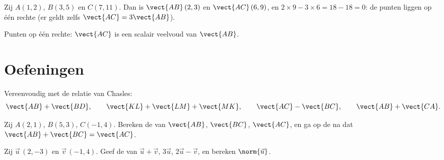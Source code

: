 \begin{example}\label{ex:g10:vectors:alignment}
Zij $A(1, 2)$, $B(3, 5)$ en $C(7, 11)$. Dan is $\vect{AB}\,(2, 3)$ en
$\vect{AC}\,(6, 9)$, en $2 \times 9 - 3 \times 6 = 18 - 18 = 0$: de punten
liggen op één rechte (er geldt zelfs $\vect{AC} = 3\vect{AB}$).
\end{example}

\begin{omfigure}

{\small Punten op één rechte: $\vect{AC}$ is een scalair veelvoud van
$\vect{AB}$.}
\end{omfigure}

\section{Oefeningen}

\begin{exercise}[$\star$]\label{exo:g10:vectors:1}
Vereenvoudig met de relatie van Chasles:
\[
\vect{AB} + \vect{BD}, \qquad
\vect{KL} + \vect{LM} + \vect{MK}, \qquad
\vect{AC} - \vect{BC}, \qquad
\vect{AB} + \vect{CA}.
\]
\end{exercise}

\begin{exercise}[$\star$]\label{exo:g10:vectors:2}
Zij $A(2, 1)$, $B(5, 3)$, $C(-1, 4)$. Bereken de  van
$\vect{AB}$, $\vect{BC}$, $\vect{AC}$, en ga op de  na dat
$\vect{AB} + \vect{BC} = \vect{AC}$.
\end{exercise}

\begin{exercise}[$\star$]\label{exo:g10:vectors:3}
Zij $\vec u\,(2, -3)$ en $\vec v\,(-1, 4)$. Geef de  van
$\vec u + \vec v$, $3\vec u$, $2\vec u - \vec v$, en bereken
$\norm{\vec u}$.
\end{exercise}

